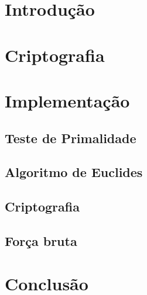 \documentclass[12pt]{article}
\begin{document}
 
\maketitle



\section{Introdução}



\section{Criptografia} \label{sec:firstpage}



\section{Implementação}



\subsection{Teste de Primalidade}



\subsection{Algoritmo de Euclides}



\subsection{Criptografia}



\subsection{Força bruta}



\section{Conclusão}





\end{document}
